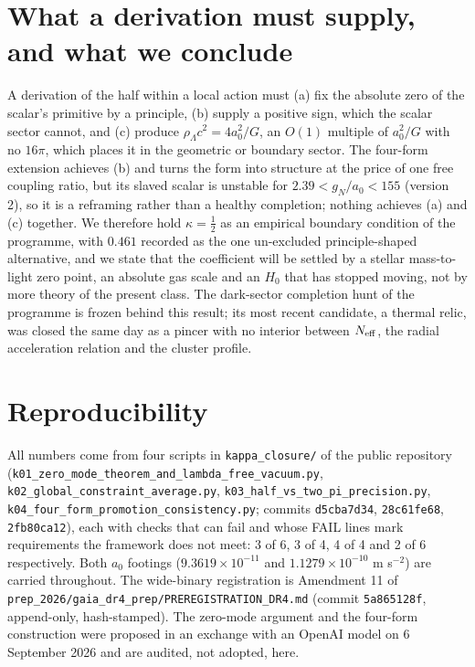 \documentclass[11pt,letterpaper]{article}
\begin{document}
\section{What a derivation must supply, and what we conclude}
A derivation of the half within a local action must (a) fix the absolute zero of the scalar's primitive by a principle, (b) supply a positive sign, which the scalar sector cannot, and (c) produce $\rho_\Lambda c^2=4a_0^2/G$, an $O(1)$ multiple of $a_0^2/G$ with no $16\pi$, which places it in the geometric or boundary sector. The four-form extension achieves (b) and turns the form into structure at the price of one free coupling ratio, but its slaved scalar is unstable for $2.39<g_N/a_0<155$ (version 2), so it is a reframing rather than a healthy completion; nothing achieves (a) and (c) together. We therefore hold $\kappa=\tfrac12$ as an empirical boundary condition of the programme, with $0.461$ recorded as the one un-excluded principle-shaped alternative, and we state that the coefficient will be settled by a stellar mass-to-light zero point, an absolute gas scale and an $H_0$ that has stopped moving, not by more theory of the present class. The dark-sector completion hunt of the programme is frozen behind this result; its most recent candidate, a thermal relic, was closed the same day as a pincer with no interior between $N_{\rm eff}$, the radial acceleration relation and the cluster profile.

\section*{Reproducibility}
\sloppy All numbers come from four scripts in \texttt{kappa\_closure/} of the public repository (\texttt{k01\_zero\_mode\_theorem\_and\_lambda\_free\_vacuum.py}, \texttt{k02\_global\_constraint\_average.py}, \texttt{k03\_half\_vs\_two\_pi\_precision.py}, \texttt{k04\_four\_form\_promotion\_consistency.py}; commits \texttt{d5cba7d34}, \texttt{28c61fe68}, \texttt{2fb80ca12}), each with checks that can fail and whose FAIL lines mark requirements the framework does not meet: 3 of 6, 3 of 4, 4 of 4 and 2 of 6 respectively. Both $a_0$ footings ($9.3619\times10^{-11}$ and $1.1279\times10^{-10}$ m s$^{-2}$) are carried throughout. The wide-binary registration is Amendment 11 of \texttt{prep\_2026/gaia\_dr4\_prep/PREREGISTRATION\_DR4.md} (commit \texttt{5a865128f}, append-only, hash-stamped). The zero-mode argument and the four-form construction were proposed in an exchange with an OpenAI model on 6 September 2026 and are audited, not adopted, here.
\end{document}
